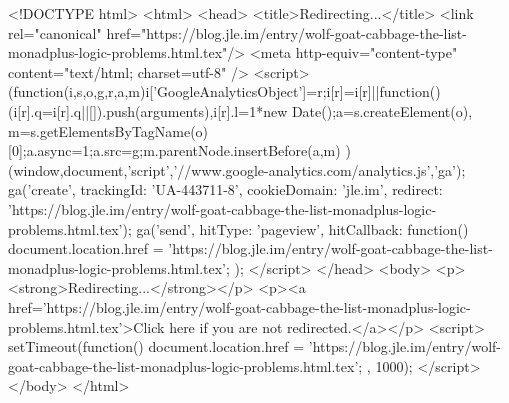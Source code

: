 <!DOCTYPE html>
<html>
<head>
<title>Redirecting...</title>
<link rel="canonical" href="https://blog.jle.im/entry/wolf-goat-cabbage-the-list-monadplus-logic-problems.html.tex"/>
<meta http-equiv="content-type" content="text/html; charset=utf-8" />
<script>
(function(i,s,o,g,r,a,m){i['GoogleAnalyticsObject']=r;i[r]=i[r]||function(){
(i[r].q=i[r].q||[]).push(arguments)},i[r].l=1*new Date();a=s.createElement(o),
m=s.getElementsByTagName(o)[0];a.async=1;a.src=g;m.parentNode.insertBefore(a,m)
})(window,document,'script','//www.google-analytics.com/analytics.js','ga');
ga('create', { trackingId: 'UA-443711-8', cookieDomain: 'jle.im', redirect: 'https://blog.jle.im/entry/wolf-goat-cabbage-the-list-monadplus-logic-problems.html.tex'});
ga('send', { hitType: 'pageview', hitCallback: function() { document.location.href = 'https://blog.jle.im/entry/wolf-goat-cabbage-the-list-monadplus-logic-problems.html.tex'; } });
</script>
</head>
<body>
  <p><strong>Redirecting...</strong></p>
  <p><a href='https://blog.jle.im/entry/wolf-goat-cabbage-the-list-monadplus-logic-problems.html.tex'>Click here if you are not redirected.</a></p>
  <script>
    setTimeout(function() { document.location.href = 'https://blog.jle.im/entry/wolf-goat-cabbage-the-list-monadplus-logic-problems.html.tex'; }, 1000);
  </script>
</body>
</html>
